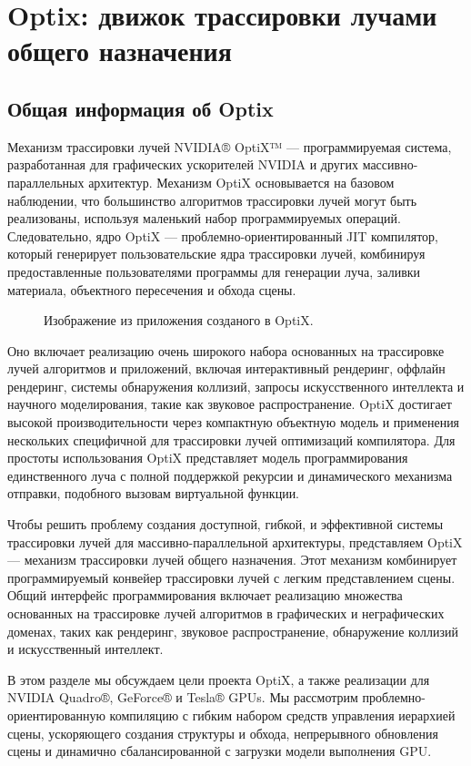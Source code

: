 \section{Optix: движок трассировки лучами общего назначения}
\subsection{Общая информация об Optix}
Механизм трассировки лучей NVIDIA® OptiX™ --- программируемая система, разработанная для графических ускорителей NVIDIA и других массивно-параллельных архитектур.
Механизм OptiX основывается на базовом наблюдении, что большинство алгоритмов трассировки лучей могут быть реализованы, используя маленький набор программируемых операций. 
Следовательно, ядро OptiX --- проблемно-ориентированный JIT компилятор, который генерирует пользовательские ядра трассировки лучей, комбинируя предоставленные пользователями программы для генерации луча, заливки материала, объектного пересечения и обхода сцены. 
\begin{figure}[h]
\caption{\small{Изображение из приложения созданого в OptiX.}}
\label{audi}
\end{figure}
Оно включает реализацию очень широкого набора основанных на трассировке лучей алгоритмов и приложений, включая интерактивный рендеринг, оффлайн рендеринг, системы обнаружения коллизий, запросы искусственного интеллекта и научного моделирования, такие как звуковое распространение. 
OptiX достигает высокой производительности через компактную объектную модель и применения нескольких специфичной для трассировки лучей оптимизаций компилятора. 
Для простоты использования OptiX представляет модель программирования единственного луча с полной поддержкой рекурсии и динамического механизма отправки, подобного вызовам виртуальной функции.

Чтобы решить проблему создания доступной, гибкой, и эффективной системы трассировки лучей для массивно-параллельной архитектуры, представляем OptiX --- механизм трассировки лучей общего назначения. 
Этот механизм комбинирует программируемый конвейер трассировки лучей с легким представлением сцены. 
Общий интерфейс программирования включает реализацию множества основанных на трассировке лучей алгоритмов в графических и неграфических доменах, таких как рендеринг, звуковое распространение, обнаружение коллизий и искусственный интеллект.

В этом разделе мы обсуждаем цели проекта OptiX, а также реализации для NVIDIA Quadro®, GeForce® и Tesla® GPUs. 
Мы рассмотрим проблемно-ориентированную компиляцию с гибким набором средств управления иерархией сцены, ускоряющего создания структуры и обхода, непрерывного обновления сцены и динамично сбалансированной с загрузки модели выполнения GPU. 

